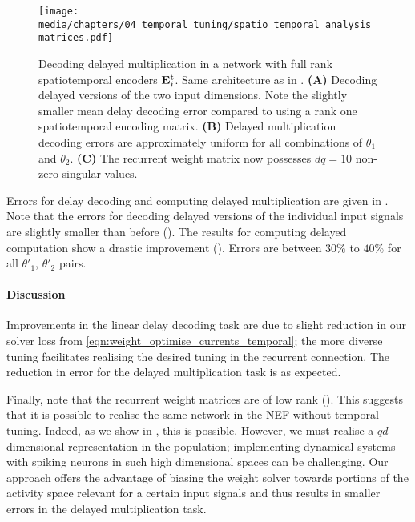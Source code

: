 \begin{figure}
	\centering
	\texttt{[image: media/chapters/04\_temporal\_tuning/spatio\_temporal\_analysis\_matrices.pdf]}%
	{\label{fig:spatio_temporal_full_a}}%
	{\label{fig:spatio_temporal_full_b}}%
	{\label{fig:spatio_temporal_full_c}}%
	\caption[Decoding delayed multiplication in a network with full rank spatiotemporal encoders]{
		Decoding delayed multiplication in a network with full rank spatiotemporal encoders $\mathbf{E}_i^\mathrm{t}$.
		Same architecture as in .
		\textbf{(A)} Decoding delayed versions of the two input dimensions. Note the slightly smaller mean delay decoding error compared to using a rank one spatiotemporal encoding matrix.
		\textbf{(B)} Delayed multiplication decoding errors are approximately uniform for all combinations of $\theta_1$ and $\theta_2$.
		\textbf{(C)} The recurrent weight matrix now possesses $d q = 10$ non-zero singular values.
	}
	\label{fig:spatio_temporal_full}
\end{figure}

Errors for delay decoding and computing delayed multiplication are given in .
Note that the errors for decoding delayed versions of the individual input signals are slightly smaller than before ().
The results for computing delayed computation show a drastic improvement ().
Errors are between $30\%$ to $40\%$ for all $\theta'_1$, $\theta'_2$ pairs.

\paragraph{Discussion}
Improvements in the linear delay decoding task are due to slight reduction in our solver loss from \cref{eqn:weight_optimise_currents_temporal}; the more diverse tuning facilitates realising the desired tuning in the recurrent connection.
The reduction in error for the delayed multiplication task is as expected.

Finally, note that the recurrent weight matrices are of low rank ().
This suggests that it is possible to realise the same network in the NEF without temporal tuning.
Indeed, as we show in , this is possible.
However, we must realise a $qd$-dimensional representation in the population; implementing dynamical systems with spiking neurons in such high dimensional spaces can be challenging.
Our approach offers the advantage of biasing the weight solver towards portions of the activity space relevant for a certain input signals and thus results in smaller errors in the delayed multiplication task.


